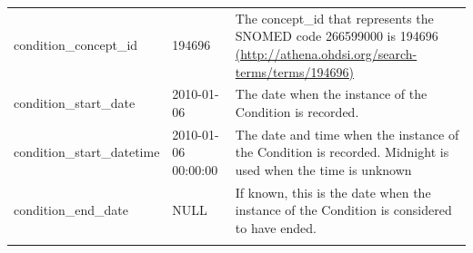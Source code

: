 \documentclass[]{book}
\begin{document}
\begin{longtable}[]{@{}lll@{}}
\begin{minipage}[t]{0.27\columnwidth}\raggedright\strut
condition\_concept\_id\strut
\end{minipage} & \begin{minipage}[t]{0.14\columnwidth}\raggedright\strut
194696\strut
\end{minipage} & \begin{minipage}[t]{0.50\columnwidth}\raggedright\strut
The concept\_id that represents the SNOMED code 266599000 is 194696
\href{http://athena.ohdsi.org/search-terms/terms/194696}{(http://athena.ohdsi.org/search-terms/terms/194696)}\strut
\end{minipage}\tabularnewline
\begin{minipage}[t]{0.27\columnwidth}\raggedright\strut
condition\_start\_date\strut
\end{minipage} & \begin{minipage}[t]{0.14\columnwidth}\raggedright\strut
2010-01-06\strut
\end{minipage} & \begin{minipage}[t]{0.50\columnwidth}\raggedright\strut
The date when the instance of the Condition is recorded.\strut
\end{minipage}\tabularnewline
\begin{minipage}[t]{0.27\columnwidth}\raggedright\strut
condition\_start\_datetime\strut
\end{minipage} & \begin{minipage}[t]{0.14\columnwidth}\raggedright\strut
2010-01-06 00:00:00\strut
\end{minipage} & \begin{minipage}[t]{0.50\columnwidth}\raggedright\strut
The date and time when the instance of the Condition is recorded.
Midnight is used when the time is unknown\strut
\end{minipage}\tabularnewline
\begin{minipage}[t]{0.27\columnwidth}\raggedright\strut
condition\_end\_date\strut
\end{minipage} & \begin{minipage}[t]{0.14\columnwidth}\raggedright\strut
NULL\strut
\end{minipage} & \begin{minipage}[t]{0.50\columnwidth}\raggedright\strut
If known, this is the date when the instance of the Condition is
considered to have ended.\strut
\end{minipage}\tabularnewline
\begin{minipage}[t]{0.27\columnwidth}\raggedright\strut

\end{minipage}
\end{longtable}
\end{document}
